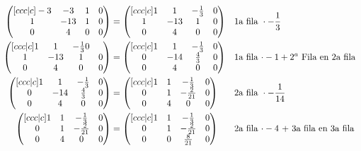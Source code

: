 \documentclass[letterpaper]{article}
\renewcommand{\*}{\cdot}
\theoremstyle{definition}
\begin{document}
\begin{align*}
\begin{pmatrix}[ccc|c]
-3 & -3 & 1 & 0 \\
1 & -13 & 1 & 0\\
0 & 4 & 0 & 0 
\end{pmatrix} &= \begin{pmatrix}[ccc|c]
1 & 1 & -\frac{1}{3} & 0\\
1 & -13 & 1 & 0 \\
0 & 4 & 0 & 0 
\end{pmatrix} && \text{1a fila } \* -\frac{1}{3}\\
\begin{pmatrix}[ccc|c]
1 & 1 & -\frac{1}{3}  0\\
1 & -13 & 1 & 0\\
0 & 4 & 0 & 0
\end{pmatrix} &= \begin{pmatrix}[ccc|c]
1 & 1 & -\frac{1}{3} &  0\\
0 & -14 & \frac{4}{3} & 0\\
0 & 4 & 0 & 0 
\end{pmatrix} && \text{1a fila $ \* -1 + 2^a$ Fila en 2a fila }\\
\begin{pmatrix}[ccc|c]
1 & 1 & -\frac{1}{3} & 0\\
0 & -14 & \frac{4}{3} &0\\
0 & 4 & 0 & 0 
\end{pmatrix} &= \begin{pmatrix}[ccc|c]
1 & 1 & -\frac{1}{3} & 0\\
0 & 1 & -\frac{2}{21} & 0\\
0 & 4 & 0 & 0
\end{pmatrix} && \text{2a fila } \* - \frac{1}{14}\\
\begin{pmatrix}[ccc|c]
1 & 1 & -\frac{1}{3} & 0\\
0 & 1 & -\frac{2}{21} & 0\\
0 & 4 & 0 & 0
\end{pmatrix}  &= \begin{pmatrix}[ccc|c]
1 & 1 & -\frac{1}{3} & 0\\
0 & 1 & -\frac{2}{21} & 0\\
0 & 0 & \frac{8}{21} & 0
\end{pmatrix}  && \text{2a fila $ \* -4 $ + 3a fila en 3a fila } \\

\end{align*}
\end{document}
